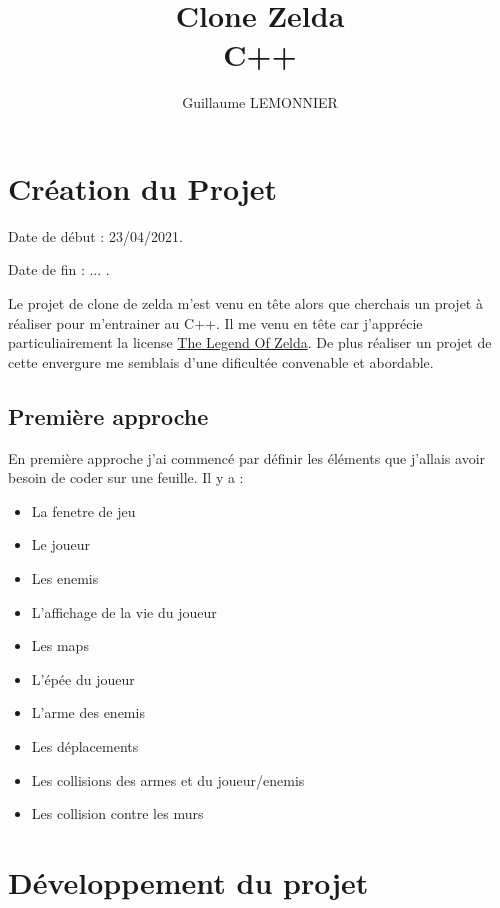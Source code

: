 \documentclass[a4paper,12pt]{article} %
\author{Guillaume LEMONNIER}
\title{Clone Zelda\\C++}
\begin{document}
\hypersetup{pdfborder = 0 0 0}

\maketitle

\newpage

\tableofcontents

\newpage

\section{Création du Projet}

Date de début : 23/04/2021.

Date de fin : ... .

Le projet de clone de zelda m'est venu en tête alors que cherchais un projet à réaliser pour m'entrainer au C++.
Il me venu en tête car j'apprécie particuliairement la license \underline{The Legend Of Zelda}.
De plus réaliser un projet de cette envergure me semblais d'une dificultée convenable et abordable.

\subsection{Première approche}

En première approche j'ai commencé par définir les éléments que j'allais avoir besoin de coder sur une feuille.
Il y a :
\begin{itemize}[label = -]
    \item La fenetre de jeu
    \item Le joueur
    \item Les enemis
    \item L'affichage de la vie du joueur
    \item Les maps
    \item L'épée du joueur
    \item L'arme des enemis
    \item Les déplacements
    \item Les collisions des armes et du joueur/enemis
    \item Les collision contre les murs
\end{itemize}

\newpage

\section{Développement du projet}
\end{document}
